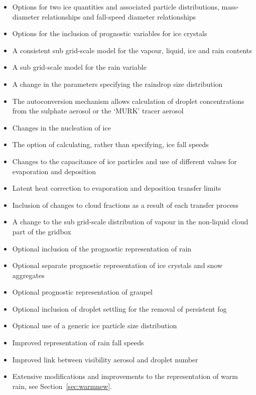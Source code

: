 \documentclass{UMDP_article}
\begin{document}
\begin{itemize}
\item{Options for two ice quantities and associated particle distributions, 
mass-diameter relationships and fall-speed diameter relationships} %
\item{Options for the inclusion of prognostic variables for ice crystals} %
\item{A consistent sub grid-scale model for the vapour, liquid, ice and 
rain contents} %
\item{A sub grid-scale model for the rain variable} %
\item{A change in the parameters specifying the raindrop size distribution} %
\item{The autoconversion mechanism allows calculation of droplet concentrations 
from the sulphate aerosol or the `MURK' tracer aerosol} %
\item{Changes in the nucleation of ice} %
\item{The option of calculating, rather than specifying, ice fall speeds} %
\item{Changes to the capacitance of ice particles and use of different values 
for evaporation and deposition} %
\item{Latent heat correction to evaporation and deposition transfer limits} %
\item{Inclusion of changes to cloud fractions as a result of each transfer process}
\item{A change to the sub grid-scale distribution of vapour in the non-liquid 
cloud part of the gridbox}
\item{Optional inclusion of the prognostic representation of rain}
\item{Optional separate prognostic representation of ice crystals and 
snow aggregates}
\item{Optional prognostic representation of graupel}
\item{Optional inclusion of droplet settling for the removal of persistent fog}
\item{Optional use of a generic ice particle size distribution 
\citep{Field:etal:2005,Field:etal:2007}}
\item{Improved representation of rain fall speeds \citep{Abel:Shipway:2007}}
\item{Improved link between visibility aerosol and droplet number}
\item{Extensive modifications and improvements to the representation of warm rain, see Section~\ref{sec:warmnew}.}
\end{itemize}
\end{document}
